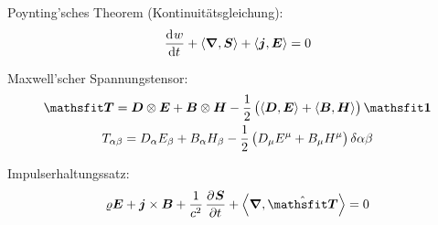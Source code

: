 Poynting'sches Theorem (Kontinuitätsgleichung):
\[
	\dod wt + \divergence{\vec S} + \inner{\vec j}{\vec E} = 0
\]

Maxwell'scher Spannungstensor:
\begin{gather*}
	\tens T
	= \vec D \otimes \vec E + \vec B \otimes \vec H
	- \half \del{\inner{\vec D}{\vec E} + \inner{\vec B}{\vec H}} \tens 1 \\
	T_{\alpha\beta}
	= D_\alpha E_\beta + B_\alpha H_\beta - \half \del{D_\mu E^\mu + B_\mu H^\mu} \delta{\alpha\beta}
\end{gather*}

Impulserhaltungssatz:
\[
	\varrho \vec E
	+ \vec j \times \vec B
	+ \frac1{c^2} \dpd{\vec S}t
	+ \divergence{\hat{\tens T}}
	= 0
\]

%	
%	



